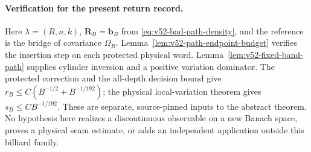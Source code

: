 \paragraph{Verification for the present return record.}
Here $\lambda=(R,n,k)$, $\mathbf R_B=\mathbf b_B$ from
\eqref{eq:v52-bad-path-density}, and the reference is the bridge of
covariance $\Omega_R$. Lemma~\ref{lem:v52-path-endpoint-budget}
verifies the insertion step on each protected physical word.
Lemma~\ref{lem:v52-fixed-band-path} supplies cylinder inversion and
a positive variation dominator. The protected correction and the
all-depth decision bound give
$r_B\le C(B^{-1/2}+B^{-1/192})$; the physical local-variation theorem
gives $s_B\le CB^{-1/192}$. These are separate, source-pinned inputs
to the abstract theorem. No hypothesis here realizes a discontinuous
observable on a new Banach space, proves a physical seam estimate,
or adds an independent application outside this billiard family.
